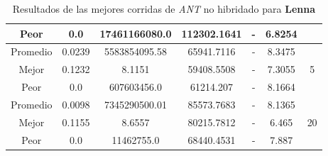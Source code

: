 \begin{table}[h!]
\begin{center}
\begin{tabular}{|c|c|c|c|c|c|c|}
            \cline{1-6}
            Peor & 0.0 & 17461166080.0  & 112302.1641 & - & 6.8254 & \\
        \hline
        \hline
            Promedio  & 0.0239 & 5583854095.58 & 65941.7116 & - & 8.3475 & \\
            \cline{1-6}
            Mejor & 0.1232 & 8.1151  & 59408.5508 & - & 7.3055 & 5\\
            \cline{1-6}
            Peor & 0.0 & 607603456.0  & 61214.207 & - & 8.1664 & \\
        \hline
        \hline
            Promedio  & 0.0098 & 7345290500.01 & 85573.7683 & - & 8.1365 & \\
            \cline{1-6}
            Mejor & 0.1155 & 8.6557  & 80215.7812 & - & 6.465 & 20\\
            \cline{1-6}
            Peor & 0.0 & 11462755.0  & 68440.4531 & - & 7.887 & \\
        \hline
        \end{tabular}
        \caption{Resultados de las mejores corridas de \emph{ANT} no hibridado para {\bf Lenna}}
        \label{tb:tableantalgimg}
    \end{center}
\end{table}
